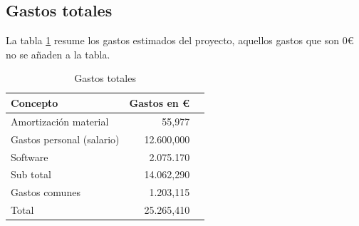 \subsection{Gastos totales}
La tabla \ref{GastosTotales} resume los gastos estimados del proyecto,
aquellos gastos que son 0€ no se a\~naden a la tabla.
\begin{table}[H]
	\begin{center}
		\begin{tabular}{l*{1}{r}r}
		    Concepto                   & Gastos en € & \\
		    \hline
		    Amortizaci\'on material    & 55,977  & \\
		    Gastos personal (salario)  & 12.600,000 & \\
		    Software                   & 2.075.170 & \\
		    \hline
		    Sub total				   & 14.062,290 & \\
		    \hline
		    Gastos comunes			   & 1.203,115 & \\
		    \hline
		    Total		               & 25.265,410 &\\
		\end{tabular}
	\caption[Gastos totales]{Gastos totales}
	\label{GastosTotales}
	\end{center}
\end{table}


